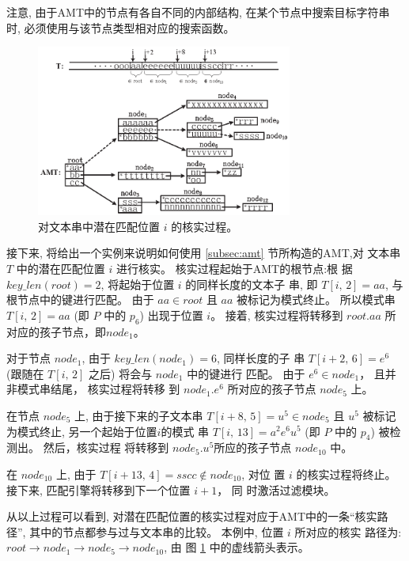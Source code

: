 注意, 由于AMT中的节点有各自不同的内部结构, 在某个节点中搜索目标字符串
时, 必须使用与该节点类型相对应的搜索函数。

\begin{figure}[H]
  \centering
  \includegraphics[width=0.75\textwidth]{figures/2_MPM/match}
  \caption{对文本串中潜在匹配位置 $i$ 的核实过程。}
  \label{fig:matching}
\end{figure}

接下来, 将给出一个实例来说明如何使用 \ref{subsec:amt} 节所构造的AMT,对
文本串 $T$ 中的潜在匹配位置 $i$ 进行核实。 核实过程起始于AMT的根节点:根
据 $key\_len(root)=2$, 将起始于位置 $i$ 的同样长度的文本子
串, 即 $T[i,\,2]=aa$, 与根节点中的键进行匹配。 由于 $aa \in
root$ 且 $aa$ 被标记为模式终止。 所以模式串 $T[i,\,2]=aa$
(即 $P$ 中的 $p_6$) 出现于位置 $i$。 接着, 核实过程将转移到 $root.aa$
所对应的孩子节点，即$node_1$。

对于节点 $node_1$, 由于 $key\_len(node_1)=6$, 同样长度的子
串 $T[i+2,\,6]=e^6$ (跟随在 $T[i,\,2]$ 之后) 将会与 $node_1$ 中的键进行
匹配。 由于 $e^6 \in node_1$， 且并非模式串结尾， 核实过程将转移
到 $node_1.e^6$ 所对应的孩子节点 $node_5$ 上。

在节点 $node_5$ 上, 由于接下来的子文本串 $T[i+8,\,5]=u^5 \in
node_5$ 且 $u^5$ 被标记为模式终止, 另一个起始于位置$i$的模式
串 $T[i,\,13]=a^2e^6u^5$ (即 $P$ 中的 $p_4$) 被检测出。 然后，核实过程
将转移到 $node_5.u^5$所应的孩子节点 $node_{10}$ 中。

在 $node_{10}$ 上, 由于 $T[i+13,\,4]=sscc \notin node_{10}$, 对位
置 $i$ 的核实过程将终止。 接下来, 匹配引擎将转移到下一个位置 $i+1$， 同
时激活过滤模块。

从以上过程可以看到, 对潜在匹配位置的核实过程对应于AMT中的一条“核实路
径”, 其中的节点都参与过与文本串的比较。 本例中, 位置 $i$ 所对应的核实
路径为:
$root \rightarrow node_1 \rightarrow node_5 \rightarrow node_{10}$, 由
图 \ref{fig:matching} 中的虚线箭头表示。


